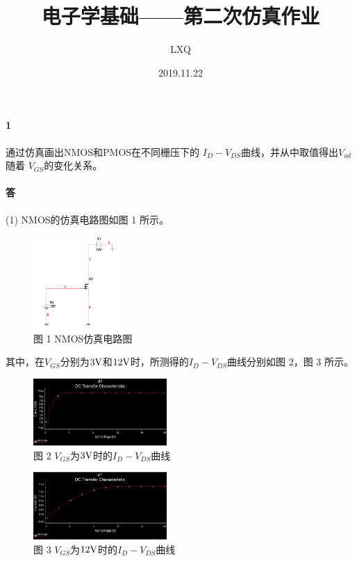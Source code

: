 \documentclass[hyperref, UTF8]{ctexart}
\title{电子学基础——第二次仿真作业}
\author{LXQ}
\date{2019.11.22}
\newcommand{\volt}{{\rm V}}
\begin{document}
\maketitle

\paragraph{1}
通过仿真画出NMOS和PMOS在不同栅压下的
$I_D-V_{DS}$曲线，并从中取值得出$V_{od}$随着
$V_{GS}$的变化关系。

\paragraph{答}

(1) NMOS的仿真电路图如图 1 所示。
\begin{figure}[!htb]
    \centering
    \includegraphics[width=0.291\textwidth]{cir1-1-a.png}
    \caption*{图 1 NMOS仿真电路图}
\end{figure}
其中，在$V_{GS}$分别为$3\volt$和$12\volt$时，所测得的$I_D-V_{DS}$曲线分别如图 2，图 3 所示。

\begin{figure}[!htb]
    \centering
    \includegraphics[width=0.452\textwidth]{res1-1-a-2.png}
    \caption*{图 2 $V_{GS}$为$3\volt$时的$I_D-V_{DS}$曲线}
\end{figure}

\begin{figure}[!htb]
    \centering
    \includegraphics[width=0.453\textwidth]{res1-1-a-1.png}
    \caption*{图 3 $V_{GS}$为$12\volt$时的$I_D-V_{DS}$曲线}
\end{figure}
\end{document}
